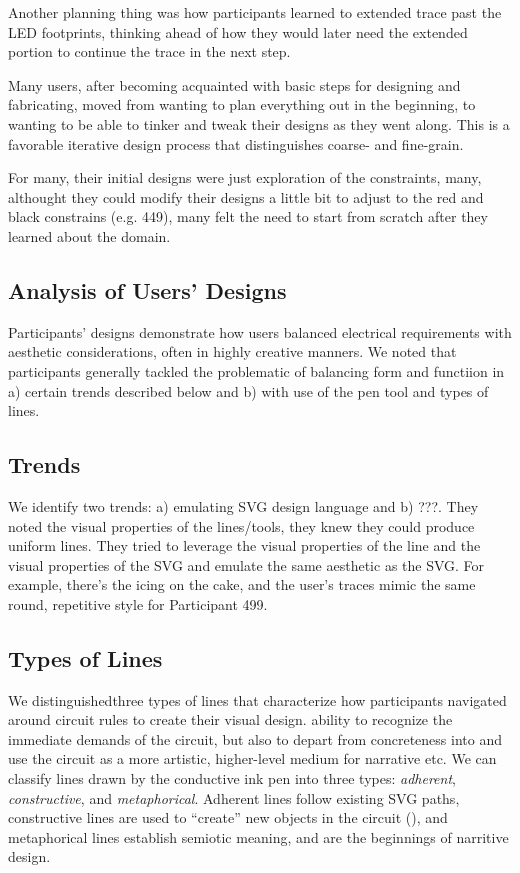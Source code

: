 \documentclass{sigchi}
\begin{document}
  Another planning thing was how participants learned to extended trace past the LED footprints, thinking ahead of how they would later need the extended portion to continue the trace in the next step.
  
  Many users, after becoming acquainted with basic steps for designing and fabricating, moved from wanting to plan everything out in the beginning, to wanting to be able to tinker and tweak their designs as they went along. This is a favorable iterative design process that distinguishes coarse- and fine-grain.
  
  For many, their initial designs were just exploration of the constraints, many, althought they could modify their designs a little bit to adjust to the red and black constrains (e.g. 449), many felt the need to start from scratch after they learned about the domain.


\subsection{Analysis of Users' Designs}
  Participants' designs demonstrate how users balanced electrical requirements with aesthetic considerations, often in highly creative manners. We noted that participants generally tackled the problematic of balancing form and functiion in a) certain trends described below and b) with use of the pen tool and types of lines.
  
  \subsection{Trends}
  
  We identify two trends: a) emulating SVG design language and b) ???. They noted the visual properties of the lines/tools, they knew they could produce uniform lines. They tried to leverage the visual properties of the line and the visual properties of the SVG and emulate the same aesthetic as the SVG. For example, there's the icing on the cake, and the user's traces mimic the same round, repetitive style for Participant 499. 
 
  
  \subsection{Types of Lines}
   We distinguishedthree types of lines that characterize how participants navigated around circuit rules to create their visual design. 
   ability to recognize the immediate demands of the circuit, but also to depart from concreteness into and use the circuit as a more artistic, higher-level medium for narrative etc.
  We can classify lines drawn by the conductive ink pen into three types: \textit{adherent}, \textit{constructive}, and \textit{metaphorical}. Adherent lines follow existing SVG paths, constructive lines are used to ``create'' new objects in the circuit (), and metaphorical lines establish semiotic meaning, and are the beginnings of narritive design.
\end{document}
